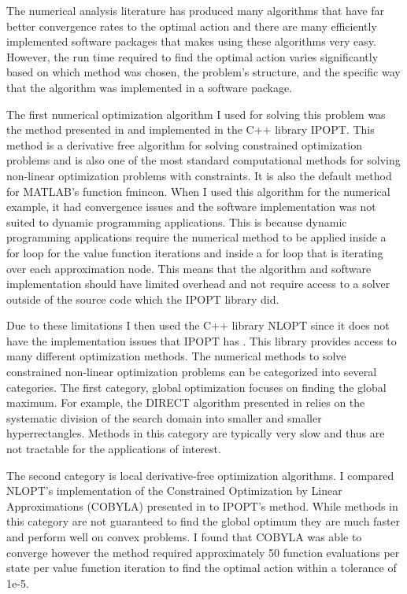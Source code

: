 \documentclass[12pt]{article}
\begin{document}
The numerical analysis literature has produced many algorithms that have far better convergence rates to the optimal action and there are many efficiently implemented software packages that makes using these algorithms very easy. However, the run time required to find the optimal action varies significantly based on which method was chosen, the problem's structure, and the specific way that the algorithm was implemented in a software package.

The first numerical optimization algorithm I used for solving this problem was the method presented in \citet{ipopt} and implemented in the C++ library IPOPT. This method is a derivative free algorithm for solving constrained optimization problems and is also one of the most standard computational methods for solving non-linear optimization problems with constraints. It is also the default method for MATLAB's function fmincon. When I used this algorithm for the numerical example, it had convergence issues and the software implementation was not suited to dynamic programming applications. This is because dynamic programming applications require the numerical method to be applied inside a for loop for the value function iterations and inside a for loop that is iterating over each approximation node. This means that the algorithm and software implementation should have limited overhead and not require access to a solver outside of the source code which the IPOPT library did.

Due to these limitations I then used the C++ library NLOPT since it does not have the implementation issues that IPOPT has \citep{nlopt}. This library provides access to many different optimization methods. The numerical methods to solve constrained non-linear optimization problems can be categorized into several categories. The first category, global optimization focuses on finding the global maximum. For example, the DIRECT algorithm presented in \cite{direct} relies on the systematic division of the search domain into smaller and smaller hyperrectangles. Methods in this category are typically very slow and thus are not tractable for the applications of interest.

The second category is local derivative-free optimization algorithms. I compared NLOPT's implementation of the Constrained Optimization by Linear Approximations (COBYLA) presented in \cite{cobyla1, cobyla2} to IPOPT's method. While methods in this category are not guaranteed to find the global optimum they are much faster and perform well on convex problems. I found that COBYLA was able to converge however the method required approximately 50 function evaluations per state per value function iteration to find the optimal action within a tolerance of 1e-5.
\end{document}
